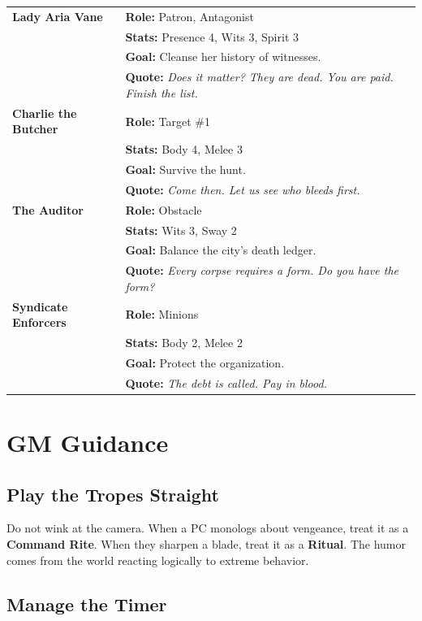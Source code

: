\documentclass[12pt]{book}
\begin{document}
\begin{longtable}{p{} p{}}
\toprule
\textbf{Lady Aria Vane} & \textbf{Role:} Patron, Antagonist \\
& \textbf{Stats:} Presence 4, Wits 3, Spirit 3 \\
& \textbf{Goal:} Cleanse her history of witnesses. \\
& \textbf{Quote:} \textit{Does it matter? They are dead. You are paid. Finish the list.} \\
\midrule
\textbf{Charlie the Butcher} & \textbf{Role:} Target \#1 \\
& \textbf{Stats:} Body 4, Melee 3 \\
& \textbf{Goal:} Survive the hunt. \\
& \textbf{Quote:} \textit{Come then. Let us see who bleeds first.} \\
\midrule
\textbf{The Auditor} & \textbf{Role:} Obstacle \\
& \textbf{Stats:} Wits 3, Sway 2 \\
& \textbf{Goal:} Balance the city's death ledger. \\
& \textbf{Quote:} \textit{Every corpse requires a form. Do you have the form?} \\
\midrule
\textbf{Syndicate Enforcers} & \textbf{Role:} Minions \\
& \textbf{Stats:} Body 2, Melee 2 \\
& \textbf{Goal:} Protect the organization. \\
& \textbf{Quote:} \textit{The debt is called. Pay in blood.} \\
\bottomrule
\end{longtable}

\chapter{GM Guidance}

\section{Play the Tropes Straight}

Do not wink at the camera. When a PC monologs about vengeance, treat it as a \textbf{Command Rite}. When they sharpen a blade, treat it as a \textbf{Ritual}. The humor comes from the world reacting logically to extreme behavior.

\section{Manage the Timer }
\end{document}
